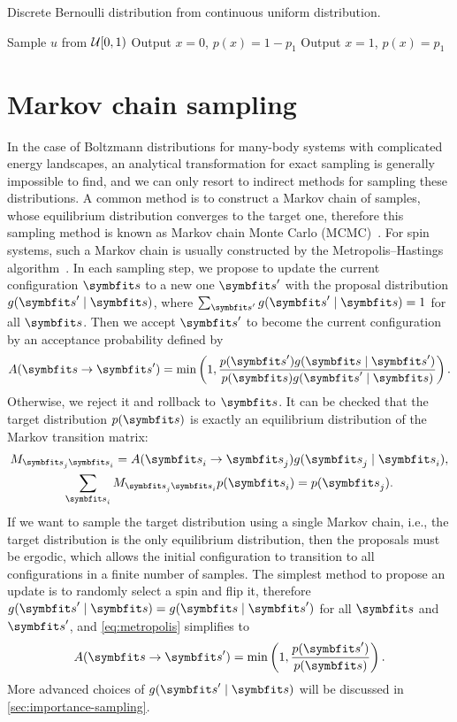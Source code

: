 \begin{algorithm}[H]
\caption[Discrete Bernoulli distribution from continuous uniform distribution]{
Discrete Bernoulli distribution from continuous uniform distribution.
}
\label{alg:bernoulli}
\begin{algorithmic}[1]
\STATE Sample $u$ from $\mathcal{U}[0, 1)$
    \STATE Output $x = 0$, $p(x) = 1 - p_1$
\ELSE
    \STATE Output $x = 1$, $p(x) = p_1$
\ENDIF
\end{algorithmic}
\end{algorithm}

\section{Markov chain sampling}

In the case of Boltzmann distributions for many-body systems with complicated energy landscapes, an analytical transformation for exact sampling is generally impossible to find, and we can only resort to indirect methods for sampling these distributions. A common method is to construct a Markov chain of samples, whose equilibrium distribution converges to the target one, therefore this sampling method is known as Markov chain Monte Carlo (MCMC)~\cite{gelfand1990sampling, robert2020markov}. For spin systems, such a Markov chain is usually constructed by the Metropolis--Hastings algorithm~\cite{hastings1970monte}. In each sampling step, we propose to update the current configuration $\vs$ to a new one $\vs'$ with the proposal distribution $g(\vs' \mid \vs)$, where $\sum_{\vs'} g(\vs' \mid \vs) = 1$ for all $\vs$. Then we accept $\vs'$ to become the current configuration by an acceptance probability defined by
\begin{equation}
A(\vs \to \vs') = \min\left( 1, \frac{p(\vs') g(\vs \mid \vs')}{p(\vs) g(\vs' \mid \vs)} \right).
\label{eq:metropolis}
\end{equation}
Otherwise, we reject it and rollback to $\vs$. It can be checked that the target distribution $p(\vs)$ is exactly an equilibrium distribution of the Markov transition matrix:
\begin{gather}
M_{\vs_j \vs_i} = A(\vs_i \to \vs_j) g(\vs_j \mid \vs_i), \label{eq:markov-matrix} \\
\sum_{\vs_i} M_{\vs_j \vs_i} p(\vs_i) = p(\vs_j).
\end{gather}
If we want to sample the target distribution using a single Markov chain, i.e., the target distribution is the only equilibrium distribution, then the proposals must be ergodic, which allows the initial configuration to transition to all configurations in a finite number of samples. The simplest method to propose an update is to randomly select a spin and flip it, therefore $g(\vs' \mid \vs) = g(\vs \mid \vs')$ for all $\vs$ and $\vs'$, and \cref{eq:metropolis} simplifies to
\begin{equation}
A(\vs \to \vs') = \min\left( 1, \frac{p(\vs')}{p(\vs)} \right).
\end{equation}
More advanced choices of $g(\vs' \mid \vs)$ will be discussed in \cref{sec:importance-sampling}.

